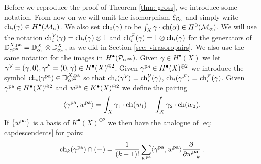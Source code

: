 \documentclass[a4paper, 12pt]{amsart}
\begin{document}
Before we reproduce the proof of Theorem \ref{thm: gross}, we introduce some notation. From now on we will omit the isomorphism $\xi_{{\mathcal G}_\alpha}$ and simply write $\mathrm{ch}_i(\gamma)\in H^\bullet({\mathcal M}_\alpha)$. We also set $\mathrm{ch}_0(\gamma)$ to be $\int_X \gamma\cdot \mathrm{ch}(\alpha)\in H^0({\mathcal M}_\alpha)$. We will use the notation $\mathrm{ch}_i^{\mathcal V}(\gamma)=\mathrm{ch}_i(\gamma)\otimes 1$ and $\mathrm{ch}_i^{\mathcal F}(\gamma)=1\otimes \mathrm{ch}_i(\gamma)$ for the generators of ${\mathbb{D}}^{X, {\mathop{\rm pa}\nolimits}}_{\alpha^{\mathop{\rm pa}\nolimits}}={\mathbb{D}}^X_{\alpha_1}\otimes {\mathbb{D}}^X_{\alpha_2}$, as we did in Section \ref{sec: virasoropairs}. We also use the same notation for the images in $H^\bullet({\mathcal P}_{\alpha^{\mathop{\rm pa}\nolimits}})$. Given $\gamma\in H^\bullet(X)$ we let $\gamma^{\mathcal V}=(\gamma, 0), \gamma^{{\mathcal F}}=(0, \gamma)\in H^\bullet(X)^{\oplus 2}$. Given $\gamma^{\mathop{\rm pa}\nolimits}\in H^\bullet(X)^{\oplus 2}$ we introduce the symbol $\mathrm{ch}_i(\gamma^{\mathop{\rm pa}\nolimits})\in {\mathbb{D}}^{X, {\mathop{\rm pa}\nolimits}}_{\alpha^{\mathop{\rm pa}\nolimits}}$ so that $\mathrm{ch}_i(\gamma^{{\mathcal V}})=\mathrm{ch}_i^{{\mathcal V}}(\gamma)$, $\mathrm{ch}_i(\gamma^{{\mathcal F}})=\mathrm{ch}_i^{{\mathcal F}}(\gamma)$. Given $\gamma^{\mathop{\rm pa}\nolimits}\in H^\bullet(X)^{\oplus 2}$ and $w^{\mathop{\rm pa}\nolimits}\in K^\bullet(X)^{\oplus 2}$ we define the pairing
\[\langle \gamma^{\mathop{\rm pa}\nolimits}, w^{\mathop{\rm pa}\nolimits} \rangle=\int_X \gamma_1\cdot \mathrm{ch}(w_1)+\int_X \gamma_2\cdot \mathrm{ch}(w_2).\]
If $\{w^{\mathop{\rm pa}\nolimits}\}$ is a basis of $K^\bullet(X)^{\oplus 2}$ we then have the analogue of \eqref{eq: capdescendents} for pairs:
\begin{equation}
\label{eq: capdescendentspairs}
\mathrm{ch}_{k}(\gamma^{\mathop{\rm pa}\nolimits})\cap(-)=\frac{1}{(k-1)!}\sum_{w^{\mathop{\rm pa}\nolimits}}\langle \gamma^{\mathop{\rm pa}\nolimits}, w^{\mathop{\rm pa}\nolimits}\rangle\frac{\partial}{\partial w^{\mathop{\rm pa}\nolimits}_{-k}}\,.
\end{equation}
\end{document}
